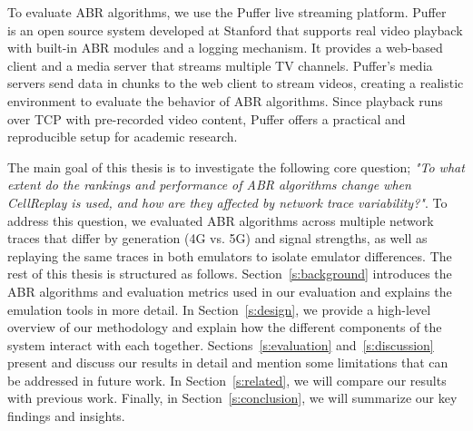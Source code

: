 To evaluate ABR algorithms, we use the Puffer live streaming platform. Puffer~\cite{yan2020-situ} is an open source system developed at Stanford that supports real video playback with built-in ABR modules and a logging mechanism. It provides a web-based client and a media server that streams multiple TV channels. Puffer’s media servers send data in chunks to the web client to stream videos, creating a realistic environment to evaluate the behavior of ABR algorithms. Since playback runs over TCP with pre-recorded video content, Puffer offers a practical and reproducible setup for academic research.

The main goal of this thesis is to investigate the following core question; \textit{"To what extent do the rankings and performance of ABR algorithms change when CellReplay is used, and how are they affected by network trace variability?"}. To address this question, we evaluated ABR algorithms across multiple network traces that differ by generation (4G vs. 5G) and signal strengths, as well as replaying the same traces in both emulators to isolate emulator differences. The rest of this thesis is structured as follows. Section~\ref{s:background} introduces the ABR algorithms and evaluation metrics used in our evaluation and explains the emulation tools in more detail. In Section~\ref{s:design}, we provide a high-level overview of our methodology and explain how the different components of the system interact with each together. Sections~\ref{s:evaluation} and~\ref{s:discussion} present and discuss our results in detail and mention some limitations that can be addressed in future work. In Section~\ref{s:related}, we will compare our results with previous work. Finally, in Section~\ref{s:conclusion}, we will summarize our key findings and insights.

